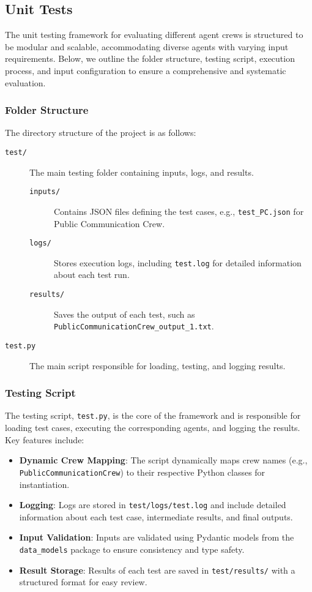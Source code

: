 \subsection{Unit Tests}
\label{subsec:unit_tests}

The unit testing framework for evaluating different agent crews is structured to be modular and scalable, accommodating diverse agents with varying input requirements. Below, we outline the folder structure, testing script, execution process, and input configuration to ensure a comprehensive and systematic evaluation.

\subsubsection*{Folder Structure}
The directory structure of the project is as follows:

\begin{description}
    \item[\texttt{test/}] The main testing folder containing inputs, logs, and results.
    \begin{description}
        \item[\texttt{inputs/}] Contains JSON files defining the test cases, e.g., \texttt{test\_PC.json} for Public Communication Crew.
        \item[\texttt{logs/}] Stores execution logs, including \texttt{test.log} for detailed information about each test run.
        \item[\texttt{results/}] Saves the output of each test, such as \texttt{PublicCommunicationCrew\_output\_1.txt}.
    \end{description}
    \item[\texttt{test.py}] The main script responsible for loading, testing, and logging results.
\end{description}

\subsubsection*{Testing Script}
The testing script, \texttt{test.py}, is the core of the framework and is responsible for loading test cases, executing the corresponding agents, and logging the results. Key features include:

\begin{itemize}
    \item \textbf{Dynamic Crew Mapping}: The script dynamically maps crew names (e.g., \texttt{PublicCommunicationCrew}) to their respective Python classes for instantiation.
    \item \textbf{Logging}: Logs are stored in \texttt{test/logs/test.log} and include detailed information about each test case, intermediate results, and final outputs.
    \item \textbf{Input Validation}: Inputs are validated using Pydantic models from the \texttt{data\_models} package to ensure consistency and type safety.
    \item \textbf{Result Storage}: Results of each test are saved in \texttt{test/results/} with a structured format for easy review.
\end{itemize}

